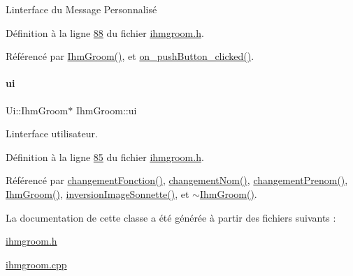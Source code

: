 L\textquotesingle{}interface du Message Personnalisé 



Définition à la ligne \hyperlink{ihmgroom_8h_source_l00088}{88} du fichier \hyperlink{ihmgroom_8h_source}{ihmgroom.\+h}.



Référencé par \hyperlink{ihmgroom_8cpp_source_l00031}{Ihm\+Groom()}, et \hyperlink{ihmgroom_8cpp_source_l00191}{on\+\_\+push\+Button\+\_\+clicked()}.

\mbox{\label{class_ihm_groom_af652e1ce199213b7867e44cf589c06b8}} 
\paragraph{\texorpdfstring{ui}{ui}}
{\footnotesize\ttfamily Ui\+::\+Ihm\+Groom$\ast$ Ihm\+Groom\+::ui\hspace{0.3cm}{\ttfamily [private]}}



L\textquotesingle{}interface utilisateur. 



Définition à la ligne \hyperlink{ihmgroom_8h_source_l00085}{85} du fichier \hyperlink{ihmgroom_8h_source}{ihmgroom.\+h}.



Référencé par \hyperlink{ihmgroom_8cpp_source_l00075}{changement\+Fonction()}, \hyperlink{ihmgroom_8cpp_source_l00065}{changement\+Nom()}, \hyperlink{ihmgroom_8cpp_source_l00070}{changement\+Prenom()}, \hyperlink{ihmgroom_8cpp_source_l00031}{Ihm\+Groom()}, \hyperlink{ihmgroom_8cpp_source_l00201}{inversion\+Image\+Sonnette()}, et \hyperlink{ihmgroom_8cpp_source_l00059}{$\sim$\+Ihm\+Groom()}.



La documentation de cette classe a été générée à partir des fichiers suivants \+:\begin{DoxyCompactItemize}
\item 
\hyperlink{ihmgroom_8h}{ihmgroom.\+h}\item 
\hyperlink{ihmgroom_8cpp}{ihmgroom.\+cpp}\end{DoxyCompactItemize}
